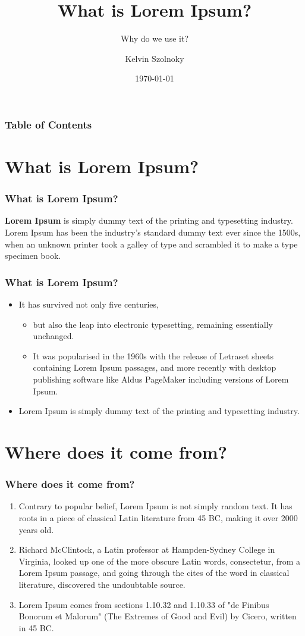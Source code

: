 \documentclass{beamer}
\title{What is Lorem Ipsum?}
\subtitle{Why do we use it?}
\author{Kelvin Szolnoky}
\institute{Karolinska Institute}
\date{\today}
\begin{document}
\frame{\titlepage}


\begin{frame}
    \frametitle{Table of Contents}
    \tableofcontents[]
\end{frame}

\section{What is Lorem Ipsum?}

\begin{frame}
    \frametitle{What is Lorem Ipsum?}
    \textbf{Lorem Ipsum} is simply dummy text of the printing and typesetting industry. Lorem Ipsum has been the industry's standard dummy text ever since the 1500s, when an unknown printer took a galley of type and scrambled it to make a type specimen book.
\end{frame}

\begin{frame}
    \frametitle{What is Lorem Ipsum?}
    \begin{itemize}
        \item It has survived not only five centuries,
              \begin{itemize}
                  \item but also the leap into electronic typesetting, remaining essentially unchanged.
                  \item It was popularised in the 1960s with the release of Letraset sheets containing Lorem Ipsum passages, and more recently with desktop publishing software like Aldus PageMaker including versions of Lorem Ipsum.
              \end{itemize}
        \item Lorem Ipsum is simply dummy text of the printing and typesetting industry.
    \end{itemize}
\end{frame}

\section{Where does it come from?}


\begin{frame}
    \frametitle{Where does it come from?}
    \begin{enumerate}
        \item Contrary to popular belief, Lorem Ipsum is not simply random text. It has roots in a piece of classical Latin literature from 45 BC, making it over 2000 years old.
        \item Richard McClintock, a Latin professor at Hampden-Sydney College in Virginia, looked up one of the more obscure Latin words, consectetur, from a Lorem Ipsum passage, and going through the cites of the word in classical literature, discovered the undoubtable source.
        \item Lorem Ipsum comes from sections 1.10.32 and 1.10.33 of "de Finibus Bonorum et Malorum" (The Extremes of Good and Evil) by Cicero, written in 45 BC.
    \end{enumerate}
\end{frame}
\end{document}
